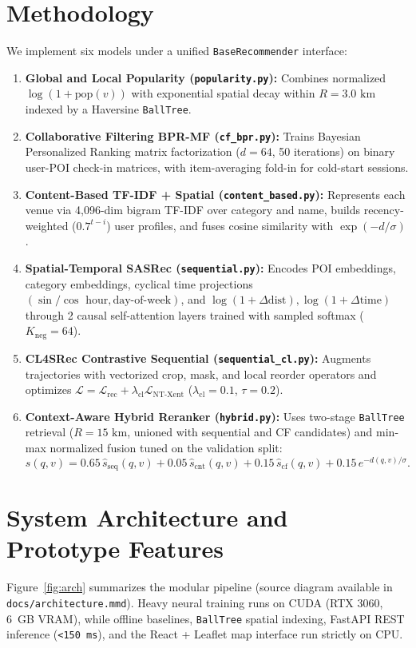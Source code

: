 \documentclass[11pt,a4paper]{article}
\begin{document}
\section{Methodology}
We implement six models under a unified \texttt{BaseRecommender} interface:
\begin{enumerate}
  \item \textbf{Global and Local Popularity (\texttt{popularity.py}):} Combines normalized $\log(1 + \text{pop}(v))$ with exponential spatial decay within $R = 3.0\text{ km}$ indexed by a Haversine \texttt{BallTree}.
  \item \textbf{Collaborative Filtering BPR-MF (\texttt{cf\_bpr.py}):} Trains Bayesian Personalized Ranking matrix factorization ($d=64$, 50 iterations) on binary user-POI check-in matrices, with item-averaging fold-in for cold-start sessions.
  \item \textbf{Content-Based TF-IDF + Spatial (\texttt{content\_based.py}):} Represents each venue via 4,096-dim bigram TF-IDF over category and name, builds recency-weighted ($0.7^{t-i}$) user profiles, and fuses cosine similarity with $\exp(-d/\sigma)$.
  \item \textbf{Spatial-Temporal SASRec (\texttt{sequential.py}):} Encodes POI embeddings, category embeddings, cyclical time projections $(\sin/\cos\text{ hour}, \text{day-of-week})$, and $\log(1+\Delta\text{dist}), \log(1+\Delta\text{time})$ through 2 causal self-attention layers trained with sampled softmax ($K_{\text{neg}}=64$).
  \item \textbf{CL4SRec Contrastive Sequential (\texttt{sequential\_cl.py}):} Augments trajectories with vectorized crop, mask, and local reorder operators and optimizes $\mathcal{L} = \mathcal{L}_{\text{rec}} + \lambda_{\text{cl}}\mathcal{L}_{\text{NT-Xent}}$ ($\lambda_{\text{cl}}=0.1$, $\tau=0.2$).
  \item \textbf{Context-Aware Hybrid Reranker (\texttt{hybrid.py}):} Uses two-stage \texttt{BallTree} retrieval ($R=15\text{ km}$, unioned with sequential and CF candidates) and min-max normalized fusion tuned on the validation split:
  \[
    s(q, v) = 0.65\,\hat{s}_{\text{seq}}(q, v) + 0.05\,\hat{s}_{\text{cnt}}(q, v) + 0.15\,\hat{s}_{\text{cf}}(q, v) + 0.15\,e^{-d(q, v)/\sigma}.
  \]
\end{enumerate}

\section{System Architecture and Prototype Features}
Figure~\ref{fig:arch} summarizes the modular pipeline (source diagram available in \texttt{docs/architecture.mmd}). Heavy neural training runs on CUDA (RTX 3060, 6~GB VRAM), while offline baselines, \texttt{BallTree} spatial indexing, FastAPI REST inference (\texttt{<150 ms}), and the React + Leaflet map interface run strictly on CPU.
\end{document}
